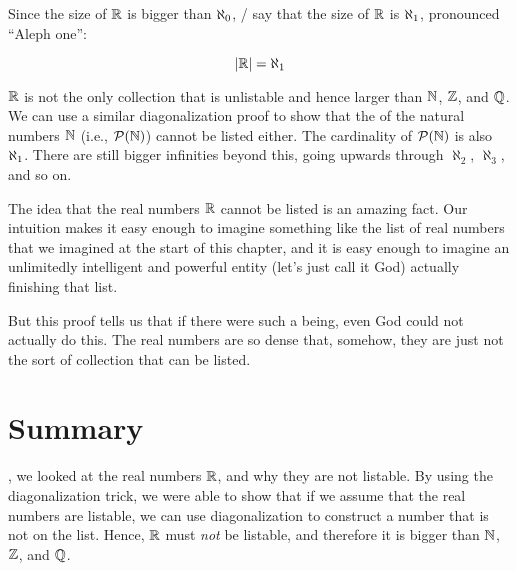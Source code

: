 \documentclass[../../../main.tex]{subfiles}
\begin{document}
Since the size of $\Reals/$ is bigger than $\AlephZero/$, \mathers/ say that the size of $\Reals/$ is $\AlephOne/$, pronounced ``Aleph one'':

\begin{equation*}
  \cardinality{\Reals/} = \AlephOne/
\end{equation*}

\begin{aside}
  \begin{remark}
    $\Reals/$ is not the only collection that is unlistable and hence larger than $\Nats/$, $\Ints/$, and $\Rationals/$. We can use a similar diagonalization proof to show that the  of the natural numbers $\Nats/$ (i.e., $\powerset{\Nats/}$) cannot be listed either. The cardinality of $\powerset{\Nats/}$ is also $\AlephOne/$. There are still bigger infinities beyond this, going upwards through $\aleph_{2}$, $\aleph_{3}$, and so on.
  \end{remark}
\end{aside}

The idea that the real numbers $\Reals/$ cannot be listed is an amazing fact. Our intuition makes it easy enough to imagine something like the list of real numbers that we imagined at the start of this chapter, and it is easy enough to imagine an unlimitedly intelligent and powerful entity (let's just call it God) actually finishing that list. 

But this proof tells us that if there were such a being, even God could not actually do this. The real numbers are so dense that, somehow, they are just not the sort of collection that can be listed.


\section{Summary}

, we looked at the real numbers $\Reals/$, and why they are not listable. By using the diagonalization trick, we were able to show that if we assume that the real numbers are listable, we can use diagonalization to construct a number that is not on the list. Hence, $\Reals/$ must \emph{not} be listable, and therefore it is bigger than $\Nats/$, $\Ints/$, and $\Rationals/$.
\end{document}

